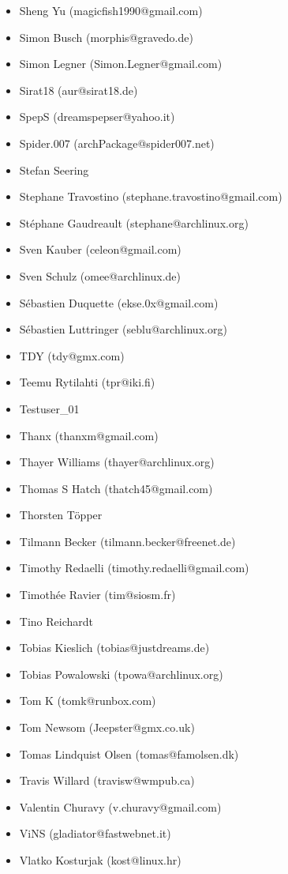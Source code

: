\begin{itemize}
\item  Sheng Yu (magicfish1990@gmail.com)
\item  Simon Busch (morphis@gravedo.de)
\item  Simon Legner (Simon.Legner@gmail.com)
\item  Sirat18 (aur@sirat18.de)
\item  SpepS (dreamspepser@yahoo.it)
\item  Spider.007 (archPackage@spider007.net)
\item  Stefan Seering
\item  Stephane Travostino (stephane.travostino@gmail.com)
\item  Stéphane Gaudreault (stephane@archlinux.org)
\item  Sven Kauber (celeon@gmail.com)
\item  Sven Schulz (omee@archlinux.de)
\item  Sébastien Duquette (ekse.0x@gmail.com)
\item  Sébastien Luttringer (seblu@archlinux.org)
\item  TDY (tdy@gmx.com)
\item  Teemu Rytilahti (tpr@iki.fi)
\item  Testuser\_01
\item  Thanx (thanxm@gmail.com)
\item  Thayer Williams (thayer@archlinux.org)
\item  Thomas S Hatch (thatch45@gmail.com)
\item  Thorsten Töpper
\item  Tilmann Becker (tilmann.becker@freenet.de)
\item  Timothy Redaelli (timothy.redaelli@gmail.com)
\item  Timothée Ravier (tim@siosm.fr)
\item  Tino Reichardt
\item  Tobias Kieslich (tobias@justdreams.de)
\item  Tobias Powalowski (tpowa@archlinux.org)
\item  Tom K (tomk@runbox.com)
\item  Tom Newsom (Jeepster@gmx.co.uk)
\item  Tomas Lindquist Olsen (tomas@famolsen.dk)
\item  Travis Willard (travisw@wmpub.ca)
\item  Valentin Churavy (v.churavy@gmail.com)
\item  ViNS (gladiator@fastwebnet.it)
\item  Vlatko Kosturjak (kost@linux.hr)

\end{itemize}
